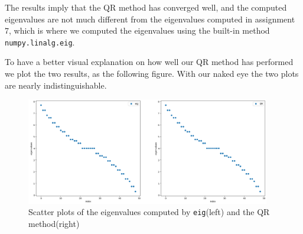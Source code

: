 \documentclass{article}
\begin{document}
The results imply that the QR method has converged well, and the computed eigenvalues are not much different from the eigenvalues computed in assignment 7, which is where we computed the eigenvalues using the built-in method \texttt{numpy.linalg.eig}. 

To have a better visual explanation on how well our QR method has performed we plot the two results, as the following figure. With our naked eye the two plots are nearly indistinguishable.

\begin{figure}[th]
  \centering
  \includegraphics[width=0.95\textwidth]{3313.png}
  \caption{Scatter plots of the eigenvalues computed by \texttt{eig}(left) and the QR method(right)}
  \label{fig:mean and std of net14}
\end{figure}
  
\end{document}
